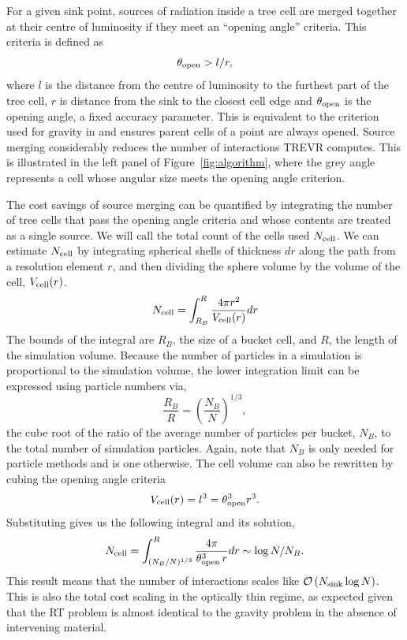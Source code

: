 \documentclass[fleq,usenatbib]{mnras}
\newcommand{\acro}{TREVR}
\newcommand{\bigO}[1]{\mathcal{O}\left(#1\right)}
\newcommand{\NK}{N_{\rm sink}}
\newcommand{\tO}{\theta_{\rm open}}
\begin{document}
{For a given sink point, sources of 
radiation inside a tree cell are merged together at their centre of luminosity if they meet an 
``opening angle'' criteria. This criteria is defined as 
\begin{equation}
\label{eqn:openangle}
\tO > l/r,
\end{equation}
where $l$ is the distance from the centre of luminosity to the furthest part of
the tree cell, $r$ is distance from the sink to the closest cell edge 
and $\tO$ is the opening angle, a fixed accuracy parameter.  This is equivalent to
the criterion used for gravity in \citet{wadsleyEt04} and ensures parent cells
of a point are always opened.  
Source merging considerably reduces the number of 
interactions \acro{} computes. This is illustrated in the left panel of 
Figure~\ref{fig:algorithm}, where the grey angle represents a cell whose 
angular size meets the opening angle criterion.

The cost savings of source merging can be quantified by integrating the number 
of tree cells that pass the opening angle criteria and whose contents are treated as a single source.
We will call the total count of the cells used $N_{\rm cell}$. We can
estimate $N_{\rm cell}$ by integrating spherical shells of 
thickness $dr$ along the path from a resolution element $r$, and then dividing 
the sphere volume by the volume of the cell, $V_{\rm cell}(r)$.
\begin{equation}
\label{eqn:nsint}
N_{\rm cell} = \int_{R_B}^R \frac{4\pi r^2}{V_{\rm cell}(r)} dr
\end{equation}
The bounds of the integral are $R_B$, the size of a bucket 
cell, and $R$, the length of the simulation volume. Because the number of 
particles in a simulation is proportional to the simulation volume, the 
lower integration limit can be expressed using particle numbers via,
\begin{equation}
\label{eqn:ratio}
\frac{R_B}{R} = \left(\frac{N_B}{N}\right)^{1/3},
\end{equation} 
the cube root of the ratio of the average number of particles per bucket, 
$N_B$, to the total number of simulation particles. Again, note that $N_B$ is 
only needed for particle methods and is one otherwise. The cell volume 
can also be rewritten by cubing the opening angle criteria
\begin{equation}
\label{eqn:vcell}
V_{\rm cell}(r) = l^3 = \tO^3 r^3.
\end{equation}
Substituting gives us the following integral and its solution,
\begin{equation}
\label{eqn:nssoln}
N_{\rm cell} = \int_{(N_B/N)^{1/3}}^R  \frac{4\pi}{\tO^3\,r} dr
\sim \log{N/N_B}.
\end{equation}
This result means that the number of interactions scales like 
$\bigO{\NK \log N}$. This is also the total cost scaling in the optically 
thin regime, as expected given that the RT problem is almost identical to 
the gravity problem in the absence of intervening material.

}
\end{document}
